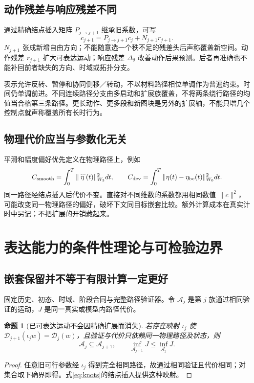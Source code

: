 \documentclass[UTF8,fontset=fandol,11pt,a4paper]{ctexart}
\theoremstyle{plain}
\newtheorem{proposition}[theorem]{命题}
\theoremstyle{definition}
\theoremstyle{remark}
\numberwithin{equation}{section}
\begin{document}
\subsection{动作残差与响应残差不同}
通过精确结点插入矩阵 $P_{j\to j+1}$ 继承旧系数，可写
\begin{equation}
c_{j+1}=P_{j\to j+1}c_j+N_{j+1}r_{j+1}.
\label{eq:embedding}
\end{equation}
$N_{j+1}$ 张成新增自由方向；不能随意选一个秩不足的残差头后声称覆盖新空间。动作残差 $r_{j+1}$ 扩大可表达运动；响应残差 $\Delta_\theta$ 改善动作后果预测。后者再准确也不能补回前者缺失的方向、时域或拓扑分支。

表示允许反转、暂停和协同侧移／转动，不以材料路径相位单调作为普遍约束。时间仍单调前进。不同连续路径分支由多启动和扩展族覆盖，不将两条绕行路径的均值当合格第三条路径。更长动作、更多段和新图块是另外的扩展轴，不能只增几个控制点就声称覆盖所有长时行为。

\subsection{物理代价应当与参数化无关}
平滑和幅度偏好优先定义在物理路径上，例如
\begin{equation}
C_{\rm smooth}=\int_0^T\|\dddot\eta(t)\|_{W_3}^2dt,
\qquad
C_{\rm dev}=\int_0^T\|\eta(t)-\eta_{\rm bc}(t)\|_{W_0}^2dt.
\end{equation}
同一路径经结点插入后代价不变。直接对不同维数的系数都用相同数值 $\|c\|^2$，可能改变同一物理路径的偏好，破坏下文同目标嵌套比较。额外计算成本在真实计时中另记；不把扩展的开销藏起来。

\section{表达能力的条件性理论与可检验边界}
\label{sec:expressivity}
\subsection{嵌套保留并不等于有限计算一定更好}
固定历史、初态、时域、阶段合同与完整路径验证器。令 $\mathcal A_j$ 是第 $j$ 族通过相同验证的运动，$J$ 是同一真实或模型内路径代价。
\begin{proposition}[已可表达运动不会因精确扩展而消失]
若存在映射 $\iota_j$ 使 $\mathcal D_{j+1}(\iota_jw)=\mathcal D_j(w)$，且验证与代价只依赖同一物理路径及状态，则
\begin{equation}
\mathcal A_j\subseteq\mathcal A_{j+1},\qquad
\inf_{\mathcal A_{j+1}}J\le\inf_{\mathcal A_j}J.
\label{eq:nesting}
\end{equation}
\end{proposition}
\begin{proof}
任意旧可行参数经 $\iota_j$ 得到完全相同路径，故通过相同验证且代价相同；对集合取下确界即得。式\eqref{eq:knots}的结点插入提供这种映射。
\end{proof}
\end{document}
